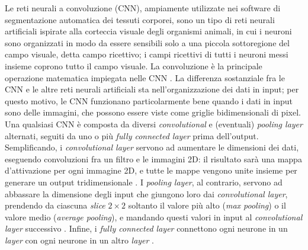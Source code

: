 Le reti neurali a convoluzione (CNN), ampiamente utilizzate nei software di segmentazione automatica dei tessuti corporei, sono un tipo di reti neurali artificiali ispirate alla corteccia visuale degli organismi animali, in cui i neuroni sono organizzati in modo da essere sensibili solo a una piccola sottoregione del campo visuale, detta campo ricettivo; i campi ricettivi di tutti i neuroni messi insieme coprono tutto il campo visuale. La convoluzione è la principale operazione matematica impiegata nelle CNN \cite[12]{LaRosa}. La differenza sostanziale fra le CNN e le altre reti neurali artificiali sta nell'organizzazione  dei dati in input; per questo motivo, le CNN funzionano particolarmente bene quando i dati in input sono delle immagini, che possono essere viste come griglie bidimensionali di pixel. Una qualsiasi CNN è composta da diversi \textit{convolutional} e (eventuali) \textit{pooling layer} alternati, seguiti da uno o più \textit{fully connected layer} prima dell'output. Semplificando, i \textit{convolutional layer} servono ad aumentare le dimensioni dei dati, eseguendo convoluzioni fra un filtro e le immagini 2D: il risultato sarà una mappa d'attivazione per ogni immagine 2D, e tutte le mappe vengono unite insieme per generare un output tridimensionale \cite[13]{LaRosa}. I \textit{pooling layer}, al contrario, servono ad abbassare la dimensione degli input che giungono loro dai \textit{convolutional layer}, prendendo da ciascuna \textit{slice} $2\times2$ soltanto il valore più alto (\textit{max pooling}) o il valore medio (\textit{average pooling}), e mandando questi valori in input al \textit{convolutional layer} successivo \cite{wiki:CNN}. Infine, i \textit{fully connected layer} connettono ogni neurone in un \textit{layer} con ogni neurone in un altro \textit{layer} \cite{wiki:CNN}.

